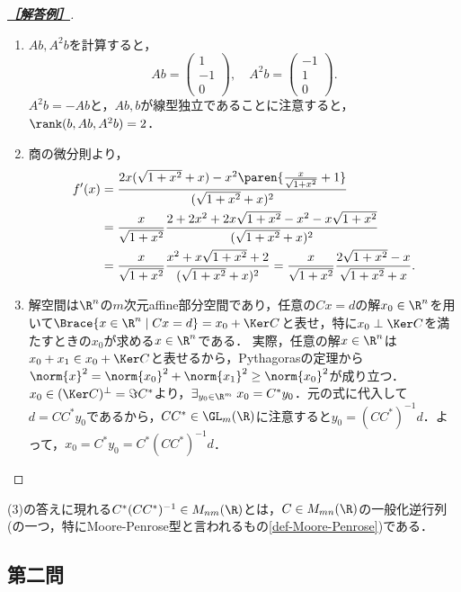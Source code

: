\documentclass[uplatex,dvipdfmx]{jsarticle}
\begin{document}
\begin{proof}[\textbf{\underline{［解答例］}}]\mbox{}
    \begin{enumerate}
        \item $Ab,A^2b$を計算すると，
        \[Ab=\begin{pmatrix}
            1\\-1\\0
        \end{pmatrix},\quad A^2b=\begin{pmatrix}-1\\1\\0\end{pmatrix}.\]
        $A^2b=-Ab$と，$Ab,b$が線型独立であることに注意すると，$\rank(b,Ab,A^2b)=2$．
        \item 商の微分則より，
        \begin{align*}
            f'(x)&=\frac{2x(\sqrt{1+x^2}+x)-x^2\paren{\frac{x}{\sqrt{1+x^2}}+1}}{(\sqrt{1+x^2}+x)^2}\\
            &=\frac{x}{\sqrt{1+x^2}}\frac{2+2x^2+2x\sqrt{1+x^2}-x^2-x\sqrt{1+x^2}}{(\sqrt{1+x^2}+x)^2}\\
            &=\frac{x}{\sqrt{1+x^2}}\frac{x^2+x\sqrt{1+x^2}+2}{(\sqrt{1+x^2}+x)^2}=\frac{x}{\sqrt{1+x^2}}\frac{2\sqrt{1+x^2}-x}{\sqrt{1+x^2}+x}.
        \end{align*}
        \item 解空間は$\R^n$の$m$次元affine部分空間であり，任意の$Cx=d$の解$x_0\in\R^n$を用いて$\Brace{x\in\R^n\mid Cx=d}=x_0+\Ker C$と表せ，特に$x_0\perp\Ker C$を満たすときの$x_0$が求める$x\in\R^n$である．
        実際，任意の解$x\in\R^n$は$x_0+x_1\in x_0+\Ker C$と表せるから，Pythagorasの定理から$\norm{x}^2=\norm{x_0}^2+\norm{x_1}^2\ge\norm{x_0}^2$が成り立つ．
        $x_0\in(\Ker C)^\perp=\Im C^*$より，$\exists_{y_0\in\R^m}\;x_0=C^*y_0$．元の式に代入して$d=CC^*y_0$であるから，$CC^*\in\GL_m(\R)$に注意すると$y_0=(CC^*)^{-1}d$．よって，$x_0=C^*y_0=C^*(CC^*)^{-1}d$．
    \end{enumerate}
\end{proof}
\begin{remarks*}[一般化逆行列]
    (3)の答えに現れる$C^*(CC^*)^{-1}\in M_{nm}(\R)$とは，$C\in M_{mn}(\R)$の一般化逆行列(の一つ，特にMoore-Penrose型と言われるもの\ref{def-Moore-Penrose})である．
\end{remarks*}

\subsection{第二問}
\end{document}
